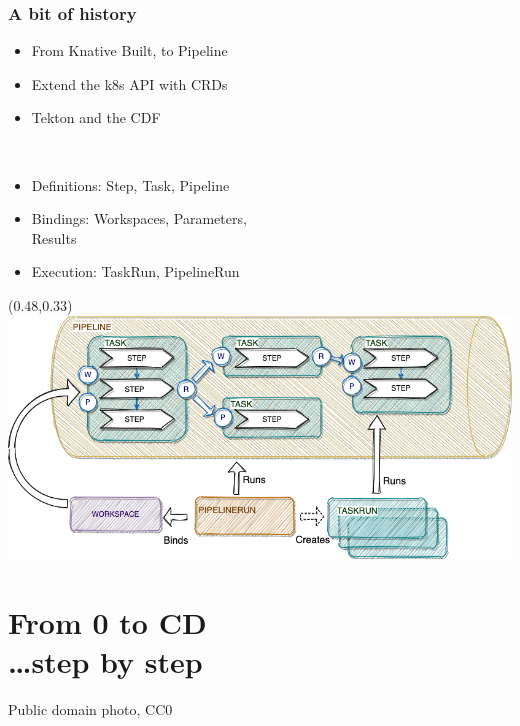 \documentclass[aspectratio=169,11pt,hyperref={colorlinks=true}]{beamer}
\begin{document}
\begin{lgrayrwhiteframe}
  \frametitle{A bit of history}
  \begin{itemize}
    \item From Knative Built, to Pipeline
    \item Extend the k8s API with CRDs
    \item Tekton and the CDF
  \end{itemize}
  \vspace{0.03\paperheight}
  ~~~~~
  \vspace{0.03\paperheight}
  \begin{itemize}
    \item Definitions: Step, Task, Pipeline
    \item Bindings: Workspaces, Parameters, \\Results
    \item Execution: TaskRun, PipelineRun
  \end{itemize}
  \begin{textblock*}{0.51\paperwidth}(0.48\paperwidth,0.33\paperheight)
    \includegraphics[width=0.5\paperwidth]{img/tekton-workspaces.png}
  \end{textblock*}
\end{lgrayrwhiteframe}

\section[From 0 to CD]{From 0 to CD\\\ldots step by step}
\begin{sectionwithpic}{Public domain photo, CC0}
\end{sectionwithpic}
\end{document}
